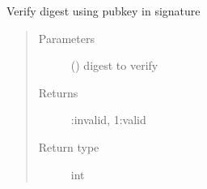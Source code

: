 \documentclass[letterpaper,10pt,english]{sphinxmanual}
\begin{document}
\begin{fulllineitems}
\begin{fulllineitems}
\end{fulllineitems}


\begin{fulllineitems}
\label{\detokenize{bbc1.core.bbclib:bbc1.core.bbclib.BBcSignature.verify}}
Verify digest using pubkey in signature
\begin{quote}\begin{description}
\item[{Parameters}] \leavevmode
{} () \textendash{} digest to verify

\item[{Returns}] :invalid, 1:valid

\item[{Return type}] \leavevmode
int

\end{description}\end{quote}

\end{fulllineitems}


\end{fulllineitems}

\end{document}
